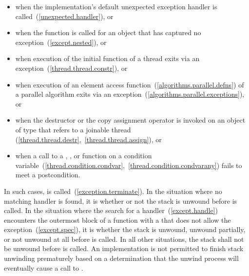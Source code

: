 \begin{note}
\begin{itemize}
\item%
when the implementation's default
unexpected exception handler
is called~(\ref{unexpected.handler}), or

\item%
when the function  is called for an object
that has captured no exception~(\ref{except.nested}), or

\item%
when execution of the initial function of a thread exits via
an exception~(\ref{thread.thread.constr}), or

\item%
when execution of an element access function~(\ref{algorithms.parallel.defns})
of a parallel algorithm exits via an exception~(\ref{algorithms.parallel.exceptions}), or

\item%
when the destructor or the copy assignment operator is invoked on an object
of type  that refers to a joinable thread
(\ref{thread.thread.destr},~\ref{thread.thread.assign}), or

\item%
when a call to a , , or 
function on a condition variable~(\ref{thread.condition.condvar},~\ref{thread.condition.condvarany})
fails to meet a postcondition.

\end{itemize}

\end{note}

\pnum
{}%
In such cases,
is called~(\ref{exception.terminate}).
In the situation where no matching handler is found, it is
 whether or not the
stack is unwound
before
is called.
In the situation where the search for a handler~(\ref{except.handle}) encounters the
outermost block of a function with a 
that does not allow the exception~(\ref{except.spec}), it is
whether the stack is unwound, unwound partially, or not unwound at all
before  is called.
In all other situations, the stack shall not be unwound before
is called.
An implementation is not permitted to finish stack unwinding
prematurely based on a determination that the unwind process
will eventually cause a call to
.

